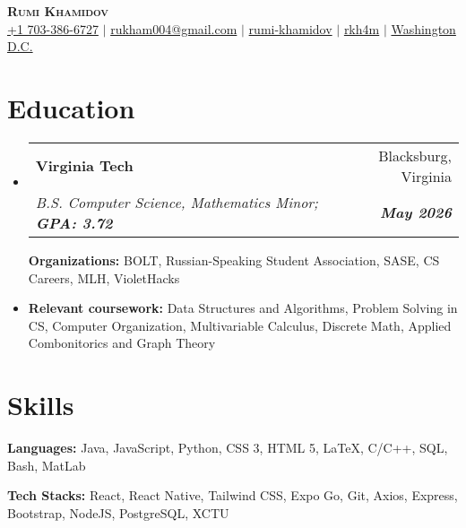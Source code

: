 \documentclass[letterpaper, 10pt]{article}
\makeatletter
\newcommand{\resumeItem}[1]{
  \item\small{
    {#1 \vspace{-2pt}}
  }
}
\newcommand{\resumeEducationHeading}[6]{
  \vspace{-2pt}\item
    \begin{tabular*}{0.97\textwidth}[t]{l@{\extracolsep{\fill}}r}
      \textbf{#1} & #2 \\
      \textit{\small#3} & \textit{\small #4} \\
    \end{tabular*}\vspace{-5pt}
}
\newcommand{\resumeSubHeadingListStart}{\begin{itemize}[leftmargin=0.15in, label={}]}
\newcommand{\resumeSubHeadingListEnd}{\end{itemize}}
\newcommand{\resumeItemListStart}{\begin{itemize}}
\newcommand{\resumeItemListEnd}{\end{itemize}\vspace{-5pt}}
\makeatother
\begin{document}

\begin{center}
    \textbf{\Huge \scshape Rumi Khamidov} \\ \vspace{3pt}
    \small
    \faMobile \hspace{.5pt} \href{tel:7033866727}{+1 703-386-6727}
    $|$
    \faAt \hspace{.5pt} \href{mailto:rukham004@gmail.com}{rukham004@gmail.com}
    $|$
    \faLinkedinSquare \hspace{.5pt} \href{https://www.linkedin.com/in/rumi-khamidov}{rumi-khamidov}
    $|$
    \faGithub \hspace{.5pt} \href{https://github.com/rkh4m}{rkh4m}
    $|$
    \faMapMarker \hspace{.5pt} \href{https://maps.app.goo.gl/aoi52DAKhQkgQ1MT8}{Washington D.C.}
\end{center}



\section{Education}
  \vspace{3pt}
  \resumeSubHeadingListStart
    
    \resumeEducationHeading
      {Virginia Tech
      }{Blacksburg, Virginia}
      {B.S. Computer Science, Mathematics Minor; \textbf{GPA: 3.72}}{\textbf{May 2026}}

        \resumeItemListStart
	   \resumeItem{\textbf{Organizations:} BOLT, Russian-Speaking Student Association, SASE, CS Careers, MLH, VioletHacks}
             \resumeItem{\textbf{Relevant coursework:}  Data Structures and Algorithms, Problem Solving in CS, Computer Organization, Multivariable Calculus, Discrete Math, Applied Combonitorics and Graph Theory}
         \resumeItemListEnd


\section{Skills}
  \vspace{2pt}
  \resumeSubHeadingListStart
    \small{\item{
        \textbf{Languages:}{ Java, JavaScript, Python, CSS 3, HTML 5, LaTeX, C/C++, SQL, Bash, MatLab } \\ \vspace{3pt}
                
        \textbf{Tech Stacks:}{ React, React Native, Tailwind CSS, Expo Go, Git, Axios, Express, Bootstrap, NodeJS, PostgreSQL, XCTU } \\ \vspace{3pt}
    }}
  \resumeSubHeadingListEnd
\end{document}

